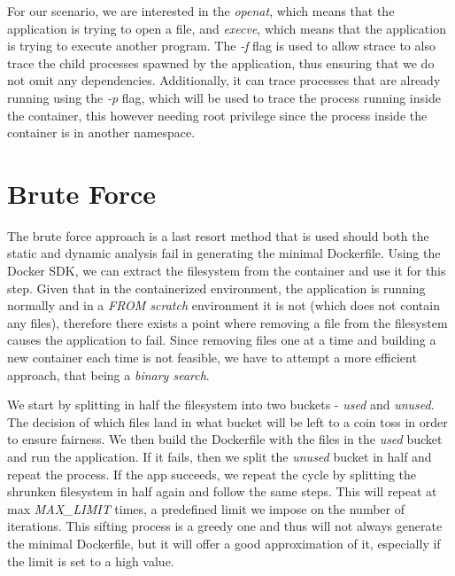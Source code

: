 For our scenario, we are interested in the \textit{openat}, which means that the application is trying to open a file, and \textit{execve}, which means that the application is trying to execute another program.
The \textit{-f} flag is used to allow strace to also trace the child processes spawned by the application, thus 
ensuring that we do not omit any dependencies. Additionally, it can trace processes that are already running using the \textit{-p} flag, which will
be used to trace the process running inside the container, this however needing root privilege since the process inside the container is in another namespace. 

\section{Brute Force}
\label{sec:brute-force}

The brute force approach is a last resort method that is used should both the static and dynamic analysis fail in generating the minimal Dockerfile.
Using the Docker SDK, we can extract the filesystem from the container and use it for this step. Given that in the containerized environment, the application is
running normally and in a \textit{FROM scratch} environment it is not (which does not contain any files), therefore there exists a point where removing a file from the filesystem causes
the application to fail. Since removing files one at a time and building a new container each time is not feasible, we have to attempt a more efficient approach, that being a \textit{binary search}.


We start by splitting in half the filesystem into two buckets - \textit{used} and \textit{unused}. The decision of which files land in what bucket will be 
left to a coin toss in order to ensure fairness. We then build the Dockerfile with the files in the \textit{used} bucket and run the application. If it fails, then we split the \textit{unused} bucket in half and repeat the process.
If the app succeeds, we repeat the cycle by splitting the shrunken filesystem in half again and follow the same steps. This will repeat at max \textit{MAX_LIMIT} times, a predefined limit we impose on the number of iterations.
This sifting process is a greedy one and thus will not always generate the minimal Dockerfile, but it will offer a good approximation of it, especially if the limit is set to a high value.
